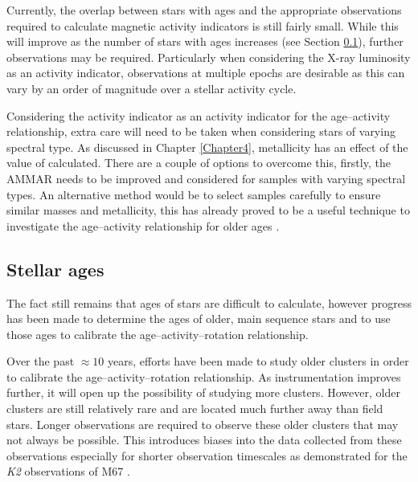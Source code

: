 Currently, the overlap between stars with ages and the appropriate observations required to calculate magnetic activity indicators is still fairly small. While this will improve as the number of stars with ages increases (see Section \ref{Chp6_future_ages}), further observations may be required. Particularly when considering the X-ray luminosity as an activity indicator, observations at multiple epochs are desirable as this can vary by an order of magnitude over a stellar activity cycle.

Considering the \Rprime activity indicator as an activity indicator for the age--activity relationship, extra care will need to be taken when considering stars of varying spectral type. As discussed in Chapter \ref{Chapter4}, metallicity has an effect of the value of \Rprime calculated. There are a couple of options to overcome this, firstly, the AMMAR \citep{Lorenzo_Oliveira_etal_2016} needs to be improved and considered for samples with varying spectral types. An alternative method would be to select samples carefully to ensure similar masses and metallicity, this has already proved to be a useful technique to investigate the age--activity relationship for older ages \citep{dos_Santos_etal_2016,Lorenzo_Oliveira_etal_2018}.

\subsection{Stellar ages}
\label{Chp6_future_ages}

The fact still remains that ages of stars are difficult to calculate, however progress has been made to determine the ages of older, main sequence stars and to use those ages to calibrate the age--activity--rotation relationship.

Over the past $\approx 10$ years, efforts have been made to study older clusters \citet{Meibom_etal_2015, Barnes_etal_2016} in order to calibrate the  age--activity--rotation relationship. As instrumentation improves further, it will open up the possibility of studying more clusters. However, older clusters are still relatively rare and are located much further away than field stars. Longer observations are required to observe these older clusters that may not always be possible. This introduces biases into the data collected from these observations especially for shorter observation timescales as demonstrated for the \textit{K2} observations of M67 \citep{Esselstein_etal_2018}.

